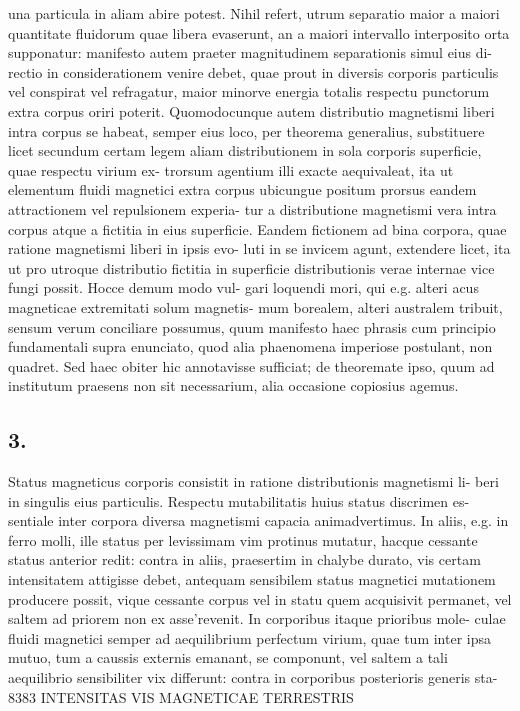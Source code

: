 \documentclass[12pt,a4paper]{article}
\begin{document}
una particula in aliam abire potest. Nihil refert, utrum separatio maior a maiori
quantitate fluidorum quae libera evaserunt, an a maiori intervallo interposito orta
supponatur: manifesto autem praeter magnitudinem separationis simul eius di-
rectio in considerationem venire debet, quae prout in diversis corporis particulis
vel conspirat vel refragatur, maior minorve energia totalis respectu punctorum
extra corpus oriri poterit.
Quomodocunque autem distributio magnetismi liberi intra corpus se habeat,
semper eius loco, per theorema generalius, substituere licet secundum certam
legem aliam distributionem in sola corporis superficie, quae respectu virium ex-
trorsum agentium illi exacte aequivaleat, ita ut elementum fluidi magnetici extra
corpus ubicungue positum prorsus eandem attractionem vel repulsionem experia-
tur a distributione magnetismi vera intra corpus atque a fictitia in eius superficie.
Eandem fictionem ad bina corpora, quae ratione magnetismi liberi in ipsis evo-
luti in se invicem agunt, extendere licet, ita ut pro utroque distributio fictitia in
superficie distributionis verae internae vice fungi possit. Hocce demum modo vul-
gari loquendi mori, qui e.g. alteri acus magneticae extremitati solum magnetis-
mum borealem, alteri australem tribuit, sensum verum conciliare possumus, quum
manifesto haec phrasis cum principio fundamentali supra enunciato, quod alia
phaenomena imperiose postulant, non quadret.     Sed haec obiter hic annotavisse
sufficiat; de theoremate ipso, quum ad institutum praesens non sit necessarium,
alia occasione copiosius agemus.


\subsection*{3.}

Status magneticus corporis consistit in ratione distributionis magnetismi li-
beri in singulis eius particulis.   Respectu mutabilitatis huius status discrimen es-
sentiale inter corpora diversa magnetismi capacia animadvertimus.         In aliis, e.g.
in ferro molli, ille status per levissimam vim protinus mutatur, hacque cessante
status anterior redit: contra in aliis, praesertim in chalybe durato, vis certam
intensitatem attigisse debet, antequam sensibilem status magnetici mutationem
producere possit, vique cessante corpus vel in statu quem acquisivit permanet,
vel saltem ad priorem non ex asse'revenit.   In corporibus itaque prioribus mole-
culae fluidi magnetici semper ad aequilibrium perfectum virium, quae tum inter
ipsa mutuo,   tum a caussis externis     emanant,    se componunt,   vel saltem   a tali
aequilibrio sensibiliter vix differunt: contra in corporibus posterioris generis sta-
8383                      INTENSITAS VIS MAGNETICAE   TERRESTRIS
\end{document}
